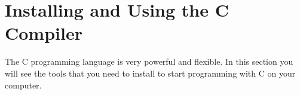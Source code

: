 \clearpage
\def\pageLang{c}
\section{Installing and Using the C Compiler} %
\label{sec:building_programs_in_c}

The C programming language is very powerful and flexible. In this section you will see the tools that you need to install to start programming with C on your computer.



